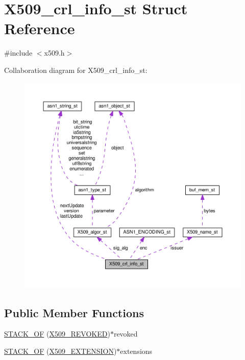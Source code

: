 \hypertarget{struct_x509__crl__info__st}{}\section{X509\+\_\+crl\+\_\+info\+\_\+st Struct Reference}
\label{struct_x509__crl__info__st}


{\ttfamily \#include $<$x509.\+h$>$}



Collaboration diagram for X509\+\_\+crl\+\_\+info\+\_\+st\+:
\nopagebreak
\begin{figure}[H]
\begin{center}
\leavevmode
\includegraphics[width=350pt]{struct_x509__crl__info__st__coll__graph}
\end{center}
\end{figure}
\subsection*{Public Member Functions}
\begin{DoxyCompactItemize}
\item 
\hyperlink{struct_x509__crl__info__st_aa3dd132530daea6e1eebbe9d1c05e69b}{S\+T\+A\+C\+K\+\_\+\+OF} (\hyperlink{ossl__typ_8h_a7acf7587e6ca6c321a6d017c2f36ac4e}{X509\+\_\+\+R\+E\+V\+O\+K\+ED})$\ast$revoked
\item 
\hyperlink{struct_x509__crl__info__st_aaee1765f67ffd7c5471e0fe3a65f731c}{S\+T\+A\+C\+K\+\_\+\+OF} (\hyperlink{x509_8h_ab2f7f7dc0ced8684e0cbfc818e408304}{X509\+\_\+\+E\+X\+T\+E\+N\+S\+I\+ON})$\ast$extensions
\end{DoxyCompactItemize}
